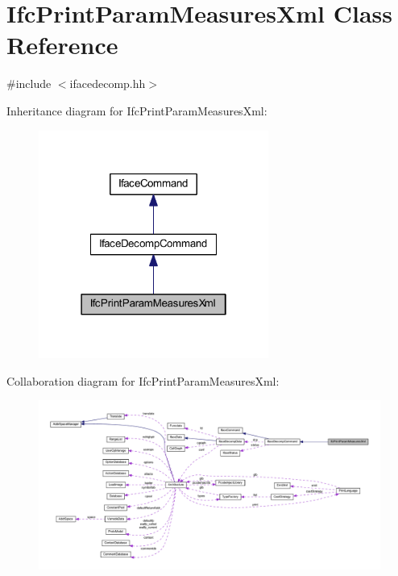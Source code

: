 \hypertarget{class_ifc_print_param_measures_xml}{}\section{Ifc\+Print\+Param\+Measures\+Xml Class Reference}
\label{class_ifc_print_param_measures_xml}


{\ttfamily \#include $<$ifacedecomp.\+hh$>$}



Inheritance diagram for Ifc\+Print\+Param\+Measures\+Xml\+:
\nopagebreak
\begin{figure}[H]
\begin{center}
\leavevmode
\includegraphics[width=214pt]{class_ifc_print_param_measures_xml__inherit__graph}
\end{center}
\end{figure}


Collaboration diagram for Ifc\+Print\+Param\+Measures\+Xml\+:
\nopagebreak
\begin{figure}[H]
\begin{center}
\leavevmode
\includegraphics[width=350pt]{class_ifc_print_param_measures_xml__coll__graph}
\end{center}
\end{figure}
